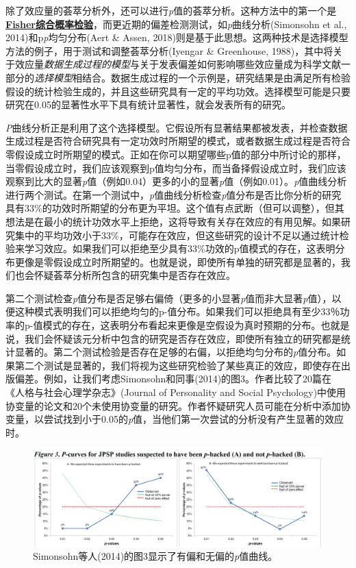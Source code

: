 \documentclass[
  letterpaper,
  DIV=11,
  numbers=noendperiod]{scrreprt}
\begin{document}
除了效应量的荟萃分析外，还可以进行\emph{p}值的荟萃分析。这种方法中的第一个是\href{https://en.wikipedia.org/wiki/Fisher\%27s_method}{\textbf{Fisher综合概率检验}}，而更近期的偏差检测测试，如\emph{p}曲线分析(Simonsohn
et al., 2014)和p\emph{p}均匀分布(Aert \& Assen,
2018)则是基于此思想。这两种技术是选择模型方法的例子，用于测试和调整荟萃分析(Iyengar
\& Greenhouse,
1988)，其中将关于效应量\emph{数据生成过程的模型}与关于发表偏差如何影响哪些效应量成为科学文献一部分的\emph{选择模型}相结合。数据生成过程的一个示例是，研究结果是由满足所有检验假设的统计检验生成的，并且这些研究具有一定的平均功效。选择模型可能是只要研究在0.05的显著性水平下具有统计显著性，就会发表所有的研究。

\emph{P}曲线分析正是利用了这个选择模型。它假设所有显著结果都被发表，并检查数据生成过程是否符合研究具有一定功效时所期望的模式，或者数据生成过程是否符合零假设成立时所期望的模式。正如在你可以期望哪些p值的部分中所讨论的那样，当零假设成立时，我们应该观察到p值均匀分布，而当备择假设成立时，我们应该观察到比大的显著\emph{p}值（例如0.04）更多的小的显著\emph{p}值（例如0.01）。\emph{p}值曲线分析进行两个测试。在第一个测试中，\emph{p}值曲线分析检查\emph{p}值分布是否比你分析的研究具有33\%的功效时所期望的分布更为平坦。这个值有点武断（但可以调整），但其想法是在最小的统计功效水平上拒绝，这将导致有关存在效应的有用见解。如果研究集中的平均功效小于33\%，可能存在效应，但这些研究的设计不足以通过统计检验来学习效应。如果我们可以拒绝至少具有33\%功效的p值模式的存在，这表明分布更像是零假设成立时所期望的。也就是说，即使所有单独的研究都是显著的，我们也会怀疑荟萃分析所包含的研究集中是否存在效应。

第二个测试检查\emph{p}值分布是否足够右偏倚（更多的小显著\emph{p}值而非大显著\emph{p}值），以便这种模式表明我们可以拒绝均匀的p-值分布。如果我们可以拒绝具有至少33％功率的p-值模式的存在，这表明分布看起来更像是空假设为真时预期的分布。也就是说，我们会怀疑该元分析中包含的研究是否存在效应，即使所有独立的研究都是统计显著的。第二个测试检验是否存在足够的右偏，以拒绝均匀分布的\emph{p}值分布。如果第二个测试是显著的，我们将视为这些研究检验了某些真正的效应，即使存在出版偏差。例如，让我们考虑Simonsohn和同事(2014)的图3。作者比较了20篇在《人格与社会心理学杂志》(Journal
of Personality and Social
Psychology)中使用协变量的论文和20个未使用协变量的研究。作者怀疑研究人员可能在分析中添加协变量，以尝试找到小于0.05的\emph{p}值，当他们第一次尝试的分析没有产生显著的效应时。

\begin{figure}

{\centering \includegraphics[width=1\textwidth,height=\textheight]{images/pcurve.png}

}

\caption{\label{fig-pcurve}Simonsohn等人(2014)的图3显示了有偏和无偏的\emph{p}值曲线。}

\end{figure}
\end{document}
